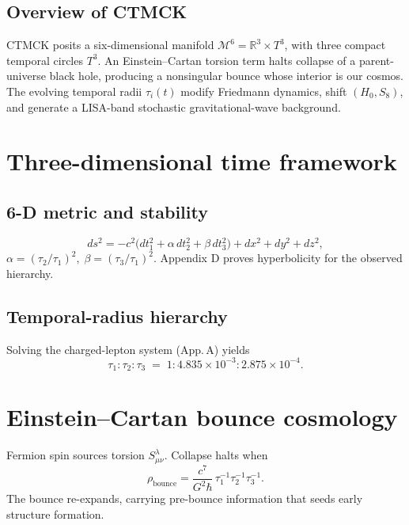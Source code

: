 \documentclass[reprint,aps,prd,amsmath,amssymb,
               nofootinbib,longbibliography]{revtex4-2}
\begin{document}
\subsection{Overview of CTMCK}
CTMCK posits a six-dimensional manifold
$\mathcal{M}^6 = \mathbb{R}^3 \times T^3$,
with three compact temporal circles $T^3$. An Einstein–Cartan
torsion term halts collapse of a parent-universe black hole,
producing a nonsingular bounce whose interior is our cosmos. The evolving
temporal radii $\tau_i(t)$ modify Friedmann dynamics,
shift $(H_0,S_8)$, and generate a LISA-band
stochastic gravitational-wave background.

\section{Three-dimensional time framework}\label{sec:framework}

\subsection{6-D metric and stability}
\begin{equation}
ds^2 = -c^2\!\bigl(dt_1^2 + \alpha\,dt_2^2 + \beta\,dt_3^2\bigr)
       + dx^2 + dy^2 + dz^2 ,
\end{equation}
$\alpha=(\tau_2/\tau_1)^2,\; \beta=(\tau_3/\tau_1)^2$.
Appendix D proves hyperbolicity for the observed hierarchy.

\subsection{Temporal-radius hierarchy}
Solving the charged-lepton system (App.\,A) yields
\begin{equation}
\tau_1 : \tau_2 : \tau_3 \;=\; 1 : 4.835\times10^{-3} : 2.875\times10^{-4}.
\end{equation}

\section{Einstein–Cartan bounce cosmology}\label{sec:bounce}
Fermion spin sources torsion $S^\lambda_{\mu\nu}$.
Collapse halts when
\begin{equation}
\rho_{\mathrm{bounce}}
  = \frac{c^7}{G^2\hbar}\,\tau_1^{-1}\tau_2^{-1}\tau_3^{-1}.
\end{equation}
The bounce re-expands, carrying pre-bounce information that seeds early
structure formation.
\end{document}
